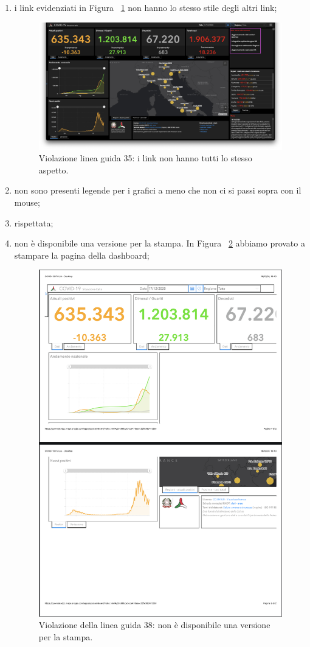 \begin{enumerate}
    \item i link evidenziati in Figura ~\ref{fig:guidelines-violations-13} non hanno lo stesso stile degli altri link;
        \begin{figure}[H]
            \centering
            \includegraphics[width=0.5\columnwidth]{../../../assets/images/verifica-risorse-esistenti/guidelines_violations_15}
            \caption{Violazione linea guida 35: i link non hanno tutti lo stesso aspetto.}
            \label{fig:guidelines-violations-13}
        \end{figure}
    \item non sono presenti legende per i grafici a meno che non ci si passi sopra con il mouse;
    \item rispettata;
    \item non è disponibile una versione per la stampa. In Figura ~\ref{fig:guidelines-violations-14} abbiamo provato a stampare la pagina della dashboard;
        \begin{figure}[H]
            \centering
            \includegraphics[width=0.5\columnwidth]{../../../assets/images/verifica-risorse-esistenti/guidelines_violations_16}
            \caption{Violazione della linea guida 38: non è disponibile una versione per la stampa.}
            \label{fig:guidelines-violations-14}

\end{figure}
\end{enumerate}
